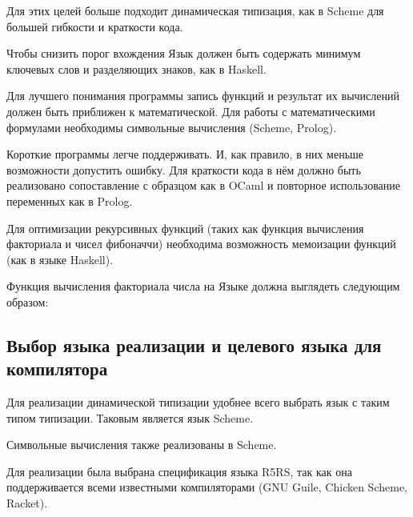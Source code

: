         Для этих целей больше подходит динамическая типизация, как в Scheme для большей гибкости и краткости кода.

        Чтобы снизить порог вхождения Язык должен быть содержать минимум ключевых слов и разделяющих знаков, как в Haskell.

        Для лучшего понимания программы запись функций и результат их вычислений должен быть приближен к математической.
        Для работы с математическими формулами необходимы символьные вычисления (Scheme, Prolog).

        Короткие программы легче поддерживать.
        И, как правило, в них меньше возможности допустить ошибку.
        Для краткости кода в нём должно быть реализовано сопоставление с образцом как в OCaml и повторное использование переменных как в Prolog.

        Для оптимизации рекурсивных функций (таких как функция вычисления факториала и чисел фибоначчи) необходима возможность мемоизации функций (как в языке Haskell).

        Функция вычисления факториала числа на Языке должна выглядеть следующим образом:

        

    \subsection{Выбор языка реализации и целевого языка для компилятора}
        Для реализации динамической типизации удобнее всего выбрать язык с таким типом типизации.
        Таковым является язык Scheme.

        Символьные вычисления также реализованы в Scheme.

        Для реализации была выбрана спецификация языка R5RS, так как она поддерживается всеми известными компиляторами (GNU Guile, Chicken Scheme, Racket).
